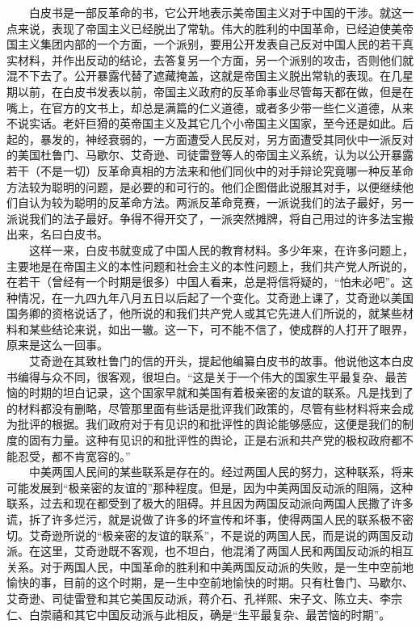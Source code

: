 \documentclass[cn,11pt,chinese]{elegantbook}
\begin{document}
　　白皮书是一部反革命的书，它公开地表示美帝国主义对于中国的干涉。就这一点来说，表现了帝国主义已经脱出了常轨。伟大的胜利的中国革命，已经迫使美帝国主义集团内部的一个方面，一个派别，要用公开发表自己反对中国人民的若干真实材料，并作出反动的结论，去答复另一个方面，另一个派别的攻击，否则他们就混不下去了。公开暴露代替了遮藏掩盖，这就是帝国主义脱出常轨的表现。在几星期以前，在白皮书发表以前，帝国主义政府的反革命事业尽管每天都在做，但是在嘴上，在官方的文书上，却总是满篇的仁义道德，或者多少带一些仁义道德，从来不说实话。老奸巨猾的英帝国主义及其它几个小帝国主义国家，至今还是如此。后起的，暴发的，神经衰弱的，一方面遭受人民反对，另方面遭受其同伙中一派反对的美国杜鲁门、马歇尔、艾奇逊、司徒雷登等人的帝国主义系统，认为以公开暴露若干（不是一切）反革命真相的方法来和他们同伙中的对手辩论究竟哪一种反革命方法较为聪明的问题，是必要的和可行的。他们企图借此说服其对手，以便继续他们自认为较为聪明的反革命方法。两派反革命竞赛，一派说我们的法子最好，另一派说我们的法子最好。争得不得开交了，一派突然摊牌，将自己用过的许多法宝搬出来，名曰白皮书。\\
　　这样一来，白皮书就变成了中国人民的教育材料。多少年来，在许多问题上，主要地是在帝国主义的本性问题和社会主义的本性问题上，我们共产党人所说的，在若干（曾经有一个时期是很多）中国人看来，总是将信将疑的，“怕未必吧”。这种情况，在一九四九年八月五日以后起了一个变化。艾奇逊上课了，艾奇逊以美国国务卿的资格说话了，他所说的和我们共产党人或其它先进人们所说的，就某些材料和某些结论来说，如出一辙。这一下，可不能不信了，使成群的人打开了眼界，原来是这么一回事。\\
　　艾奇逊在其致杜鲁门的信的开头，提起他编纂白皮书的故事。他说他这本白皮书编得与众不同，很客观，很坦白。“这是关于一个伟大的国家生平最复杂、最苦恼的时期的坦白记录，这个国家早就和美国有着极亲密的友谊的联系。凡是找到了的材料都没有删略，尽管那里面有些话是批评我们政策的，尽管有些材料将来会成为批评的根据。我们政府对于有见识的和批评性的舆论能够感应，这便是我们的制度的固有力量。这种有见识的和批评性的舆论，正是右派和共产党的极权政府都不能忍受，都不肯宽容的。”\\
　　中美两国人民间的某些联系是存在的。经过两国人民的努力，这种联系，将来可能发展到“极亲密的友谊的”那种程度。但是，因为中美两国反动派的阻隔，这种联系，过去和现在都受到了极大的阻碍。并且因为两国反动派向两国人民撒了许多谎，拆了许多烂污，就是说做了许多的坏宣传和坏事，使得两国人民的联系极不密切。艾奇逊所说的“极亲密的友谊的联系”，不是说的两国人民，而是说的两国反动派。在这里，艾奇逊既不客观，也不坦白，他混淆了两国人民和两国反动派的相互关系。对于两国人民，中国革命的胜利和中美两国反动派的失败，是一生中空前地愉快的事，目前的这个时期，是一生中空前地愉快的时期。只有杜鲁门、马歇尔、艾奇逊、司徒雷登和其它美国反动派，蒋介石、孔祥熙、宋子文、陈立夫、李宗仁、白崇禧和其它中国反动派与此相反，确是“生平最复杂、最苦恼的时期”。\\
\end{document}
